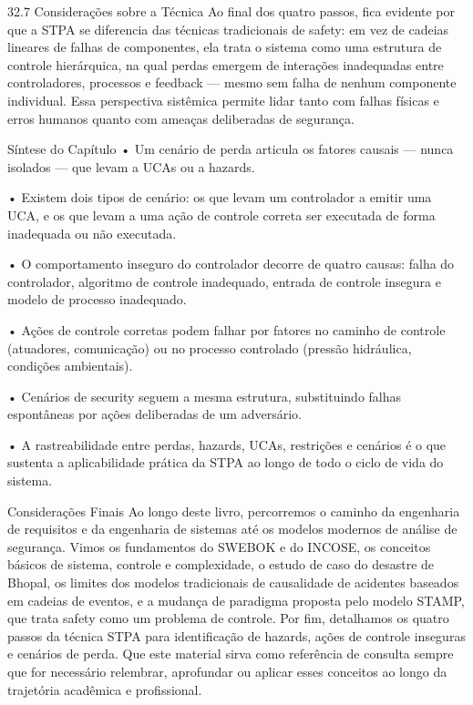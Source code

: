32.7 Considerações sobre a Técnica Ao final dos quatro passos, fica evidente por que a STPA se diferencia das técnicas tradicionais de safety: em vez de cadeias lineares de falhas de componentes, ela trata o sistema como uma estrutura de controle hierárquica, na qual perdas emergem de interações inadequadas entre controladores, processos e feedback — mesmo sem falha de nenhum componente individual. Essa perspectiva sistêmica permite lidar tanto com falhas físicas e erros humanos quanto com ameaças deliberadas de segurança.

Síntese do Capítulo • Um cenário de perda articula os fatores causais — nunca isolados — que levam a UCAs ou a hazards.

• Existem dois tipos de cenário: os que levam um controlador a emitir uma UCA, e os que levam a uma ação de controle correta ser executada de forma inadequada ou não executada.

• O comportamento inseguro do controlador decorre de quatro causas: falha do controlador, algoritmo de controle inadequado, entrada de controle insegura e modelo de processo inadequado.

• Ações de controle corretas podem falhar por fatores no caminho de controle (atuadores, comunicação) ou no processo controlado (pressão hidráulica, condições ambientais).

• Cenários de security seguem a mesma estrutura, substituindo falhas espontâneas por ações deliberadas de um adversário.

• A rastreabilidade entre perdas, hazards, UCAs, restrições e cenários é o que sustenta a aplicabilidade prática da STPA ao longo de todo o ciclo de vida do sistema.

Considerações Finais Ao longo deste livro, percorremos o caminho da engenharia de requisitos e da engenharia de sistemas até os modelos modernos de análise de segurança. Vimos os fundamentos do SWEBOK e do INCOSE, os conceitos básicos de sistema, controle e complexidade, o estudo de caso do desastre de Bhopal, os limites dos modelos tradicionais de causalidade de acidentes baseados em cadeias de eventos, e a mudança de paradigma proposta pelo modelo STAMP, que trata safety como um problema de controle. Por fim, detalhamos os quatro passos da técnica STPA para identificação de hazards, ações de controle inseguras e cenários de perda. Que este material sirva como referência de consulta sempre que for necessário relembrar, aprofundar ou aplicar esses conceitos ao longo da trajetória acadêmica e profissional.
